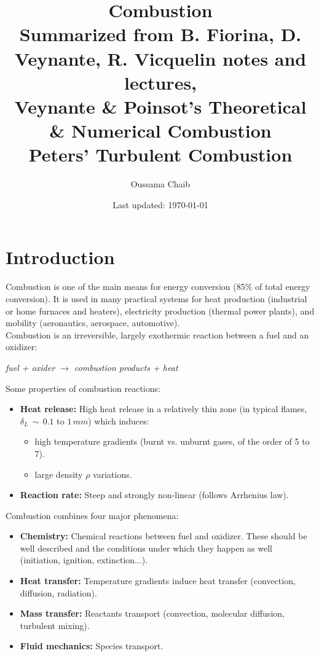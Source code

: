 \documentclass[a4paper,11pt]{article}
\title{%
Combustion \\
\vspace{10pt}
\small Summarized from B. Fiorina, D. Veynante, R. Vicquelin notes and lectures,\\
Veynante \& Poinsot's Theoretical \& Numerical Combustion\\
Peters' Turbulent Combustion}
\author{\small Oussama Chaib}
\date{\small Last updated: \today}
\begin{document}
\maketitle
\tableofcontents
\pagebreak
\section{Introduction}

Combustion is one of the main means for energy conversion (85\% of total energy conversion). It is used in many practical systems for heat production (industrial or home furnaces and heaters), electricity production (thermal power plants), and mobility (aeronautics, aerospace, automotive).\\
Combustion is an irreversible, largely exothermic reaction between a fuel and an oxidizer:
\begin{center}
\emph{fuel + oxider $\rightarrow$ combustion products + heat}
\end{center}
Some properties of combustion reactions:
\begin{itemize}
    \item \textbf{Heat release:} High heat release in a relatively thin zone (in typical flames, $\delta _L\,\sim\,0.1$ to $1\,mm$) which induces:
    \begin{itemize}
        \item high temperature gradients (burnt vs. unburnt gases, of the order of 5 to 7).
        \item large density $\rho$ variations.
    \end{itemize}
    \item \textbf{Reaction rate:} Steep and strongly non-linear (follows Arrhenius law).
\end{itemize}
Combustion combines four major phenomena:
\begin{itemize}
    \item \textbf{Chemistry:} Chemical reactions between fuel and oxidizer. These should be well described and the conditions under which they happen as well (initiation, ignition, extinction...).
    \item \textbf{Heat transfer:} Temperature gradients induce heat transfer (convection, diffusion, radiation).
    \item \textbf{Mass transfer:} Reactants transport (convection, molecular diffusion, turbulent mixing).
    \item \textbf{Fluid mechanics:} Species transport.
\end{itemize}
\end{document}
